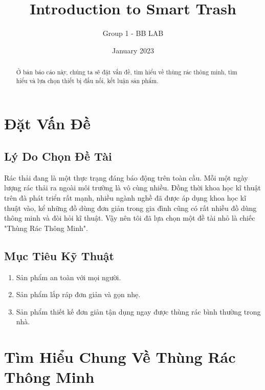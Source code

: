 \documentclass[12pt,a4paper]{article}
\title{Introduction to Smart Trash}
\author{Group 1 - BB LAB}
\date{January 2023}
\begin{document}
\maketitle
\begin{abstract}
  Ở bản báo cáo này, chúng ta sẽ đặt vấn đề, tìm hiểu về thùng rác thông minh, tìm hiểu và lựa chọn thiết bị đấu nối, kết luận sản phẩm.
\end{abstract}
\tableofcontents
\newpage
\section{Đặt Vấn Đề}
\subsection{Lý Do Chọn Đề Tài} 
Rác thải đang là một thực trạng đáng báo động trên toàn cầu. Mỗi một ngày lượng rác thải ra ngoài môi trường là vô cùng nhiều. Đồng thời khoa học kĩ thuật trên đà phát triển rất mạnh, nhiều ngành nghề đã được áp dụng khoa học kĩ thuật vào, kể những đồ dùng đơn giản trong gia đình cũng có rất nhiều đồ dùng thông minh và đòi hỏi kĩ thuật. Vậy nên tôi đã lựa chọn một đề tài nhỏ là
chiếc "Thùng Rác Thông Minh".
\subsection{Mục Tiêu Kỹ Thuật}
\begin{enumerate}
    \item Sản phẩm an toàn với mọi người.
    \item Sản phẩm lắp ráp đơn giản và gọn nhẹ.
    \item Sản phẩm thiết kế đơn giản tận dụng ngay được thùng rác bình thường trong nhà.
\end{enumerate}
\section{Tìm Hiểu Chung Về Thùng Rác Thông Minh}
\end{document}
